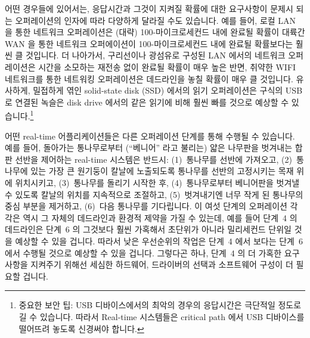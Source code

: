 어떤 경우들에 있어서는, 응답시간과 그것이 지켜질 확률에 대한 요구사항이 문제시
되는 오퍼레이션의 인자에 따라 다양하게 달라질 수도 있습니다.
예를 들어, 로컬 LAN 을 통한 네트워크 오퍼레이션은 (대략) 100-마이크로세컨드
내에 완료될 확률이 대륙간 WAN 을 통한 네트워크 오퍼에이션이 100-마이크로세컨드
내에 완료될 확률보다는 훨씬 클 것입니다.
더 나아가서, 구리선이나 광섬유로 구성된 LAN 에서의 네트워크 오퍼레이션은 시간을
소모하는 재전송 없이 완료될 확률이 매우 높은 반면, 취약한 WIFI 네트워크를 통한
네트워킹 오퍼레이션은 데드라인을 놓칠 확률이 매우 클 것입니다.
유사하게, 밀접하게 엮인 solid-state disk (SSD) 에서의 읽기 오퍼레이션은 구식의
USB 로 연결된 녹슬은 disk drive 에서의 같은 읽기에 비해 훨씬 빠를 것으로 예상할
수 있습니다.\footnote{
	중요한 보안 팁: USB 디바이스에서의 최악의 경우의 응답시간은 극단적일
	정도로 길 수 있습니다.
	따라서 Real-time 시스템들은 critical path 에서 USB 디바이스를 떨어뜨려
	놓도록 신경써야 합니다.}

어떤 real-time 어플리케이션들은 다른 오퍼레이션 단계를 통해 수행될 수 있습니다.
예를 들어, 돌아가는 통나무로부터 (``베니어'' 라고 불리는) 얇은 나무판을
벗겨내는 합판 선반을 제어하는 real-time 시스템은 반드시:
(1)~통나무를 선반에 가져오고,
(2)~통나무에 있는 가장 큰 원기둥이 칼날에 노출되도록 통나무를 선반의 고정시키는
목재 위에 위치시키고,
(3)~통나무를 돌리기 시작한 후,
(4)~통나무로부터 베니어판을 벗겨낼 수 있도록 칼날의 위치를 지속적으로 조절하고,
(5)~벗겨내기엔 너무 작게 된 통나무의 중심 부분을 제거하고,
(6)~다음 통나무를 기다립니다.
이 여섯 단계의 오퍼레이션 각각은 역시 그 자체의 데드라인과 환경적 제약을 가질
수 있는데, 예를 들어 단계~4 의 데드라인은 단계~6 의 그것보다 훨씬 가혹해서
초단위가 아니라 밀리세컨드 단위일 것을 예상할 수 있을 겁니다.
따라서 낮은 우선순위의 작업은 단계~4 에서 보다는 단계~6 에서 수행될 것으로
예상할 수 있을 겁니다.
그렇다곤 하나, 단계~4 의 더 가혹한 요구사항을 지켜주기 위해선 세심한 하드웨어,
드라이버의 선택과 소프트웨어 구성이 더 필요할 겁니다.
\iffalse

